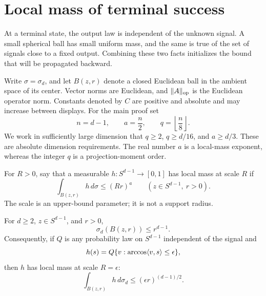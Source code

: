 \section{Local mass of terminal success}\label{h:local}

At a terminal state, the output law is independent of the unknown
signal. A small spherical ball has small uniform mass, and the same is
true of the set of signals close to a fixed output. Combining these
two facts initializes the bound that will be propagated backward.

Write \(\sigma=\sigma_d\), and let \(B(z,r)\) denote a closed
Euclidean ball in the ambient space of its center. Vector norms are
Euclidean, and \(\|A\|_{\mathrm{op}}\) is the Euclidean operator norm. Constants
denoted by \(C\) are positive and absolute and may increase between
displays. For the main proof set
\begin{equation}\label{h:local:parameters}
 n=d-1,\qquad a=\frac n2,\qquad
 q=\left\lfloor\frac n8\right\rfloor.
\end{equation}
We work in sufficiently large dimension that
\(q\ge2\), \(q\ge d/16\), and \(a\ge d/3\). These are absolute
dimension requirements. The real number \(a\) is a local-mass
exponent, whereas the integer \(q\) is a projection-moment order.

For \(R>0\), say that a measurable \(h:S^{d-1}\to[0,1]\) has local
mass at scale \(R\) if
\begin{equation}\label{h:local:bound}
 \int_{B(z,r)}h\,d\sigma\le(Rr)^a
 \qquad(z\in S^{d-1},\ r>0).
\end{equation}
The scale is an upper-bound parameter; it is not a support radius.

\begin{lemma}\label{h:local:caps}
For \(d\ge2\), \(z\in S^{d-1}\), and \(r>0\),
\begin{equation}\label{h:local:cap}
 \sigma_d(B(z,r))\le r^{d-1}.
\end{equation}
Consequently, if \(Q\) is any probability law on \(S^{d-1}\)
independent of the signal and
\[
 h(s)=Q\{v:\arccos\langle v,s\rangle\le\epsilon\},
\]
then \(h\) has local mass at scale \(R=\epsilon\):
\begin{equation}\label{h:local:terminal}
 \int_{B(z,r)}h\,d\sigma_d\le(\epsilon r)^{(d-1)/2}.
\end{equation}
\end{lemma}

